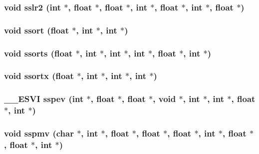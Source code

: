 \subsubsection{\setlength{\rightskip}{0pt plus 5cm}void sslr2 (int $\ast$, float $\ast$, float $\ast$, int $\ast$, float $\ast$, int $\ast$, float $\ast$)}\label{essl_8h_8ce3437008039dd1f1b2221ec8081d57}


\subsubsection{\setlength{\rightskip}{0pt plus 5cm}void ssort (float $\ast$, int $\ast$, int $\ast$)}\label{essl_8h_59ce3c7452f76aa63e4cb2c64216b770}


\subsubsection{\setlength{\rightskip}{0pt plus 5cm}void ssorts (float $\ast$, int $\ast$, int $\ast$, int $\ast$, float $\ast$, int $\ast$)}\label{essl_8h_39b5aa67e0d1266ef4330961f33e9f17}


\subsubsection{\setlength{\rightskip}{0pt plus 5cm}void ssortx (float $\ast$, int $\ast$, int $\ast$, int $\ast$)}\label{essl_8h_9a5aba4432a5bb98fc50f45ddbefbd45}


\subsubsection{\setlength{\rightskip}{0pt plus 5cm}\_\-\_\-ESVI sspev (int $\ast$, float $\ast$, float $\ast$, void $\ast$, int $\ast$, int $\ast$, float $\ast$, int $\ast$)}\label{essl_8h_16f2168ad489228531c77e137140a820}


\subsubsection{\setlength{\rightskip}{0pt plus 5cm}void sspmv (char $\ast$, int $\ast$, float $\ast$, float $\ast$, float $\ast$, int $\ast$, float $\ast$, float $\ast$, int $\ast$)}\label{essl_8h_3e50ad0e1a108fe33c90c76ee54444c6}


